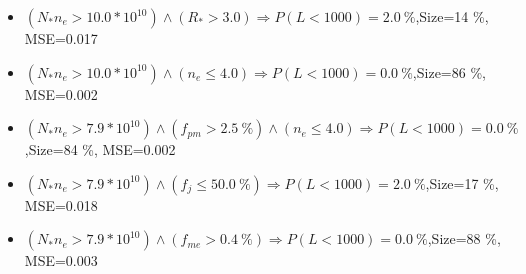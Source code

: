 \documentclass[numbered]{CSL}
\begin{document}
\begin{itemize}
\item $(N_* n_e > 10.0 * 10^{10}) \land (R_* > 3.0) \Rightarrow P(L < 1 000) = 2.0~\%$,\hfill Size=14 \%, MSE=0.017
\item $(N_* n_e > 10.0 * 10^{10}) \land (n_e \leq 4.0) \Rightarrow P(L < 1 000) = 0.0~\%$,\hfill Size=86 \%, MSE=0.002
\item $(N_* n_e > 7.9 * 10^{10}) \land (f_{pm} > 2.5~\%) \land (n_e \leq 4.0) \Rightarrow P(L < 1 000) = 0.0~\%$,\hfill Size=84 \%, MSE=0.002
\item $(N_* n_e > 7.9 * 10^{10}) \land (f_j \leq 50.0~\%) \Rightarrow P(L < 1 000) = 2.0~\%$,\hfill Size=17 \%, MSE=0.018
\item $(N_* n_e > 7.9 * 10^{10}) \land (f_{me} > 0.4~\%) \Rightarrow P(L < 1 000) = 0.0~\%$,\hfill Size=88 \%, MSE=0.003
\end{itemize}
\end{document}
